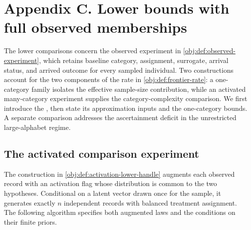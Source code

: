 \section{Appendix C. Lower bounds with full observed memberships}

The lower comparisons concern the observed experiment in \cref{obj:def:observed-experiment}, which retains baseline category, assignment, surrogate, arrival status, and arrived outcome for every sampled individual. Two constructions account for the two components of the rate in \cref{obj:def:frontier-rate}: a one-category family isolates the effective sample-size contribution, while an activated many-category experiment supplies the category-complexity comparison. We first introduce the , then state its approximation inputs and the one-category bounds. A separate comparison addresses the ascertainment deficit in the unrestricted large-alphabet regime.

\subsection{The activated comparison experiment}

The construction in \cref{obj:def:activation-lower-handle} augments each observed record with an activation flag whose distribution is common to the two hypotheses. Conditional on a latent vector drawn once for the sample, it generates exactly \(n\) independent records with balanced treatment assignment. The following algorithm specifies both augmented laws and the conditions on their finite priors.


